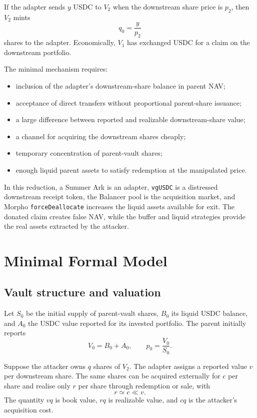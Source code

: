 \documentclass[11pt]{article}
\begin{document}
If the adapter sends $y$ USDC to $V_2$ when the downstream share price is $p_2$, then $V_2$ mints
\begin{equation}
    q_0=\frac{y}{p_2}
\end{equation}
shares to the adapter.  Economically, $V_1$ has exchanged USDC for a claim on the downstream portfolio.

The minimal mechanism requires:
\begin{itemize}[nosep]
    \item inclusion of the adapter's downstream-share balance in parent NAV;
    \item acceptance of direct transfers without proportional parent-share issuance;
    \item a large difference between reported and realizable downstream-share value;
    \item a channel for acquiring the downstream shares cheaply;
    \item temporary concentration of parent-vault shares;
    \item enough liquid parent assets to satisfy redemption at the manipulated price.
\end{itemize}

In this reduction, a Summer Ark is an adapter, \texttt{vgUSDC} is a distressed downstream receipt token, the Balancer pool is the acquisition market, and Morpho \texttt{forceDeallocate} increases the liquid assets available for exit.  The donated claim creates false NAV, while the buffer and liquid strategies provide the real assets extracted by the attacker.

\section{Minimal Formal Model}

\subsection{Vault structure and valuation}

Let $S_0$ be the initial supply of parent-vault shares, $B_0$ its liquid USDC balance, and $A_0$ the USDC value reported for its invested portfolio.  The parent initially reports
\begin{equation}
    V_0=B_0+A_0,
    \qquad
    p_0=\frac{V_0}{S_0}.
\end{equation}

Suppose the attacker owns $q$ shares of $V_2$.  The adapter assigns a reported value $v$ per downstream share.  The same shares can be acquired externally for $c$ per share and realise only $r$ per share through redemption or sale, with
\begin{equation}
    r\simeq c\ll v.
\end{equation}
The quantity $vq$ is book value, $rq$ is realizable value, and $cq$ is the attacker's acquisition cost.
\end{document}
